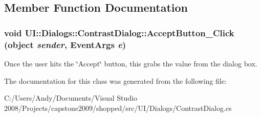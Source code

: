 \subsection{Member Function Documentation}
\hypertarget{class_u_i_1_1_dialogs_1_1_contrast_dialog_a09bc379f0949d32c392a26672150246d}{
\subsubsection[{AcceptButton\_\-Click}]{\setlength{\rightskip}{0pt plus 5cm}void UI::Dialogs::ContrastDialog::AcceptButton\_\-Click (object {\em sender}, \/  EventArgs {\em e})}}
\label{class_u_i_1_1_dialogs_1_1_contrast_dialog_a09bc379f0949d32c392a26672150246d}
Once the user hits the \char`\"{}Accept\char`\"{} button, this grabs the value from the dialog box. 

The documentation for this class was generated from the following file:\begin{DoxyCompactItemize}
\item 
C:/Users/Andy/Documents/Visual Studio 2008/Projects/capstone2009/shopped/src/UI/Dialogs/ContrastDialog.cs\end{DoxyCompactItemize}
